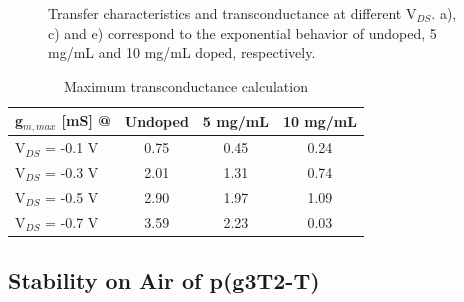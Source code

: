 \begin{figure}[ht]
    \qquad
    \caption{Transfer characteristics and transconductance at different V$_{DS}$. a), c) and e) correspond to the exponential behavior of undoped, 5 mg/mL and 10 mg/mL doped, respectively.}
    \label{fig:transfercurves}
\end{figure}

\begin{table}[ht]
\centering
\caption{Maximum transconductance calculation}
\begin{tabular}{l|c|c|c}
g$_{m,max}$ [mS] @ & Undoped & 5 mg/mL & 10 mg/mL \\\hline
V$_{DS}$ = -0.1 V & 0.75 & 0.45 & 0.24\\
V$_{DS}$ = -0.3 V & 2.01 & 1.31 & 0.74\\
V$_{DS}$ = -0.5 V & 2.90 & 1.97 & 1.09\\
V$_{DS}$ = -0.7 V & 3.59 & 2.23 & 0.03\\ \hline
\end{tabular}
\label{tab:fom}
\end{table}


\subsection{Stability on Air of p(g3T2-T)}

